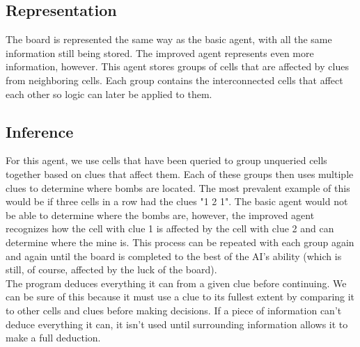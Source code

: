 \documentclass[13pt]{report}
\begin{document}
\subsection*{Representation}
The board is represented the same way as the basic agent, with all the same information still being stored. The improved agent represents even more information, however. This agent stores groups of cells that are affected by clues from neighboring cells. Each group contains the interconnected cells that affect each other so logic can later be applied to them.

\subsection*{Inference}
For this agent, we use cells that have been queried to group unqueried cells together based on clues that affect them. Each of these groups then uses multiple clues to determine where bombs are located. The most prevalent example of this would be if three cells in a row had the clues "1 2 1". The basic agent would not be able to determine where the bombs are, however, the improved agent recognizes how the cell with clue 1 is affected by the cell with clue 2 and can determine where the mine is. This process can be repeated with each group again and again until the board is completed to the best of the AI's ability (which is still, of course, affected by the luck of the board).\\
The program deduces everything it can from a given clue before continuing. We can be sure of this because it must use a clue to its fullest extent by comparing it to other cells and clues before making decisions. If a piece of information can't deduce everything it can, it isn't used until surrounding information allows it to make a full deduction.
\end{document}
